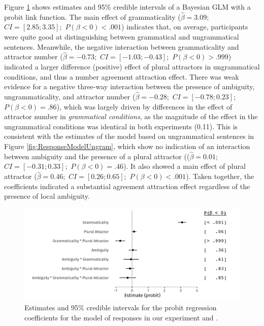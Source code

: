 \documentclass[]{interact}
\theoremstyle{plain}%
\theoremstyle{definition}
\theoremstyle{remark}
\begin{document}
Figure \ref{fig:ResponseModel} shows estimates and 95\% credible intervals of a Bayesian GLM with a probit link function. The main effect of grammaticality ($\hat{\beta}=3.09;$ $CI=[2.85; 3.35];$ $P(\beta<0)< .001$) indicates that, on average, participants were quite good at distinguishing between grammatical and ungrammatical sentences. Meanwhile, the negative interaction between grammaticality and attractor number ($\hat{\beta}=-0.73;$ $CI=[-1.03; -0.43];$ $P(\beta<0)> .999$) indicated a larger difference (positive) effect of plural attractors in ungrammatical conditions, and thus a number agreement attraction effect. There was weak evidence for a negative three-way interaction between the presence of ambiguity, ungrammaticality, and attractor number ($\hat{\beta}=-0.28;$ $CI=[-0.78; 0.23];$ $P(\beta<0)=    .86$), which was largely driven by differences in the effect of attractor number in \textit{grammatical conditions}, as the magnitude of the effect in the ungrammatical conditions was identical in both experiments (0.11).  
This is consistent with the estimates of the model based on ungrammatical sentences in Figure \ref{fig:ResponseModelUngram}, which show no indication of an interaction between ambiguity and the presence of a plural attractor (($\hat{\beta}=0.01;$ $CI=[-0.31; 0.33];$ $P(\beta<0)=    .46$). It also showed a main effect of plural attractor ($\hat{\beta}=0.46;$ $CI=[0.26; 0.65];$ $P(\beta<0)< .001$). Taken together, the coefficients indicated a substantial agreement attraction effect regardless of the presence of local ambiguity.  



\begin{figure}[hbt!]
\centering

\includegraphics[width=\linewidth]{ResponseModel-1.jpg}

\caption{Estimates and 95\% credible intervals for the probit regression coefficients for the model of responses in our experiment and \citet{LagoEtAl:2019}.}
\label{fig:ResponseModel}
\end{figure}
\end{document}
